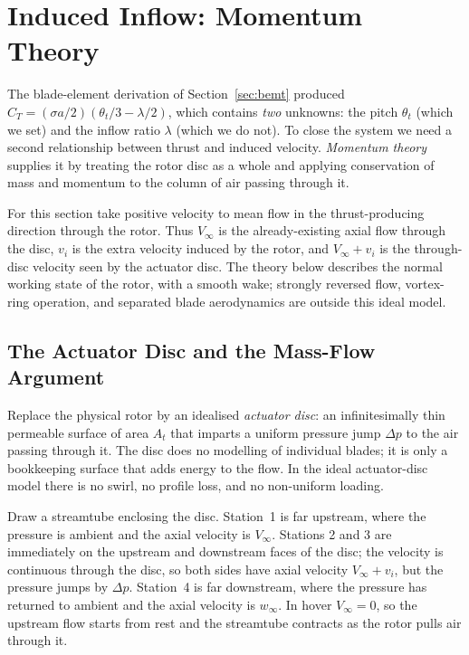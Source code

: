 \documentclass[11pt,a4paper]{article}
\newcommand{\At}{A_t}
\newcommand{\thetat}{\theta_t}
\newcommand{\vi}{v_i}
\let\oldsection\section
\renewcommand{\section}{\clearpage\oldsection}
\begin{document}
\section{Induced Inflow: Momentum Theory}\label{sec:inflow}

The blade-element derivation of Section~\ref{sec:bemt} produced
\(C_T = (\sigma a/2)(\thetat/3 - \lambda/2)\), which contains \emph{two}
unknowns: the pitch \(\thetat\) (which we set) and the inflow ratio
\(\lambda\) (which we do not). To close the system we need a second
relationship between thrust and induced velocity. \emph{Momentum theory}
supplies it by treating the rotor disc as a whole and applying conservation
of mass and momentum to the column of air passing through it.

For this section take positive velocity to mean flow in the thrust-producing
direction through the rotor. Thus \(V_\infty\) is the already-existing axial
flow through the disc, \(\vi\) is the extra velocity induced by the rotor, and
\(V_\infty+\vi\) is the through-disc velocity seen by the actuator disc. The
theory below describes the normal working state of the rotor, with a smooth
wake; strongly reversed flow, vortex-ring operation, and separated blade
aerodynamics are outside this ideal model.

\subsection{The Actuator Disc and the Mass-Flow Argument}\label{ssec:actuator_disc}

Replace the physical rotor by an idealised \emph{actuator disc}: an
infinitesimally thin permeable surface of area \(\At\) that imparts a
uniform pressure jump \(\Delta p\) to the air passing through it. The
disc does no modelling of individual blades; it is only a bookkeeping
surface that adds energy to the flow. In the ideal actuator-disc model
there is no swirl, no profile loss, and no non-uniform loading.

Draw a streamtube enclosing the disc. Station~1 is far upstream, where
the pressure is ambient and the axial velocity is \(V_\infty\). Stations
2 and 3 are immediately on the upstream and downstream faces of the disc;
the velocity is continuous through the disc, so both sides have axial
velocity \(V_\infty+\vi\), but the pressure jumps by \(\Delta p\).
Station~4 is far downstream, where the pressure has returned to ambient
and the axial velocity is \(w_\infty\). In hover \(V_\infty=0\), so the
upstream flow starts from rest and the streamtube contracts as the rotor
pulls air through it.
\end{document}
